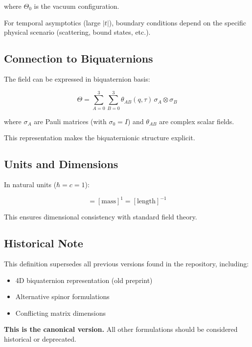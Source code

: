 \noindent where $\Theta_0$ is the vacuum configuration.

For temporal asymptotics (large $|t|$), boundary conditions depend on the specific physical scenario (scattering, bound states, etc.).

\subsection{Connection to Biquaternions}

The field can be expressed in biquaternion basis:

\begin{equation}
\label{eq:canonical:theta_biquaternion}
\Theta = \sum_{A=0}^{3} \sum_{B=0}^{3} \theta_{AB}(q,\tau) \, \sigma_A \otimes \sigma_B
\end{equation}

\noindent where $\sigma_A$ are Pauli matrices (with $\sigma_0 = I$) and $\theta_{AB}$ are complex scalar fields.

This representation makes the biquaternionic structure explicit.

\subsection{Units and Dimensions}

In natural units ($\hbar = c = 1$):

\begin{equation}
[\Theta] = [\text{mass}]^1 = [\text{length}]^{-1}
\end{equation}

This ensures dimensional consistency with standard field theory.

\subsection{Historical Note}

This definition supersedes all previous versions found in the repository, including:
\begin{itemize}
    \item 4D biquaternion representation (old preprint)
    \item Alternative spinor formulations
    \item Conflicting matrix dimensions
\end{itemize}

\textbf{This is the canonical version.} All other formulations should be considered historical or deprecated.

